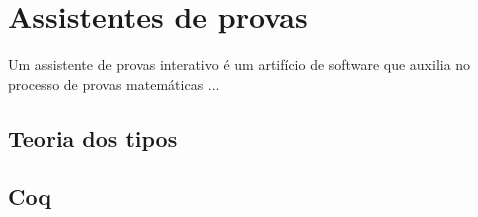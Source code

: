 \chapter{Assistentes de provas}

Um assistente de provas interativo é um artifício de software que auxilia no processo de provas matemáticas ...

\section{Teoria dos tipos}

\section{Coq}

\cite{chlipala}
